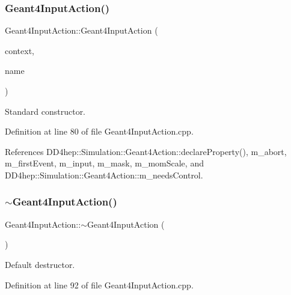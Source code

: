 \subsubsection{\texorpdfstring{Geant4\+Input\+Action()}{Geant4InputAction()}}
{\footnotesize\ttfamily Geant4\+Input\+Action\+::\+Geant4\+Input\+Action (\begin{DoxyParamCaption}\item[{\hyperlink{class_d_d4hep_1_1_simulation_1_1_geant4_context}{Geant4\+Context} $\ast$}]{context,  }\item[{const std\+::string \&}]{name }\end{DoxyParamCaption})}



Standard constructor. 



Definition at line 80 of file Geant4\+Input\+Action.\+cpp.



References D\+D4hep\+::\+Simulation\+::\+Geant4\+Action\+::declare\+Property(), m\+\_\+abort, m\+\_\+first\+Event, m\+\_\+input, m\+\_\+mask, m\+\_\+mom\+Scale, and D\+D4hep\+::\+Simulation\+::\+Geant4\+Action\+::m\+\_\+needs\+Control.

\hypertarget{class_d_d4hep_1_1_simulation_1_1_geant4_input_action_a82b07efc96d11b7dfacb36c718d41c26}{}\label{class_d_d4hep_1_1_simulation_1_1_geant4_input_action_a82b07efc96d11b7dfacb36c718d41c26} 
\subsubsection{\texorpdfstring{$\sim$\+Geant4\+Input\+Action()}{~Geant4InputAction()}}
{\footnotesize\ttfamily Geant4\+Input\+Action\+::$\sim$\+Geant4\+Input\+Action (\begin{DoxyParamCaption}{ }\end{DoxyParamCaption})\hspace{0.3cm}{\ttfamily [virtual]}}



Default destructor. 



Definition at line 92 of file Geant4\+Input\+Action.\+cpp.



